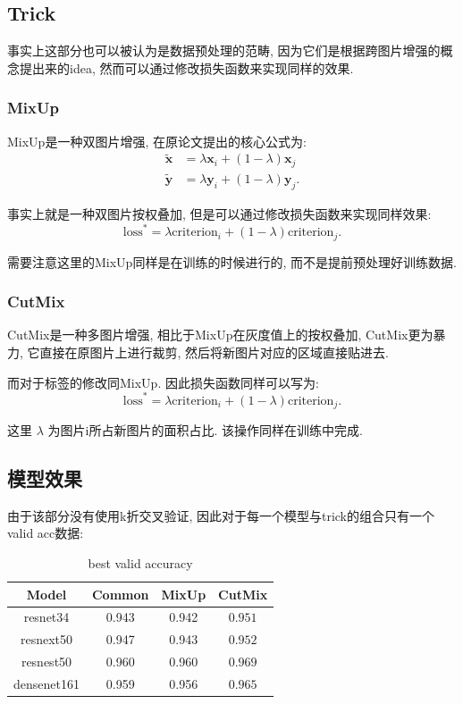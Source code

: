 \documentclass[lang=cn,12pt,a4paper,cite=authoryear]{elegantpaper}
\begin{document}
\subsection{Trick}
事实上这部分也可以被认为是数据预处理的范畴, 因为它们是根据跨图片增强的概念提出来的idea, 然而可以通过修改损失函数来实现同样的效果.
\subsubsection{MixUp}
MixUp是一种双图片增强, 在原论文提出的核心公式为:
\begin{equation*}
\begin{aligned}
    \tilde{\bm{x}} &= \lambda \bm{x}_i + (1 - \lambda)\bm{x}_j\\
    \tilde{\bm{y}} &= \lambda \bm{y}_i + (1 - \lambda)\bm{y}_j.
\end{aligned}
\end{equation*}

事实上就是一种双图片按权叠加, 但是可以通过修改损失函数来实现同样效果:
\begin{equation*}
    \mathrm{loss}^{*} = \lambda \mathrm{criterion}_i + (1 - \lambda) \mathrm{criterion}_j.
\end{equation*}

需要注意这里的MixUp同样是在训练的时候进行的, 而不是提前预处理好训练数据.

\subsubsection{CutMix}
CutMix是一种多图片增强, 相比于MixUp在灰度值上的按权叠加, CutMix更为暴力, 它直接在原图片上进行裁剪, 然后将新图片对应的区域直接贴进去.

而对于标签的修改同MixUp. 因此损失函数同样可以写为:
\begin{equation*}
    \mathrm{loss}^{*} = \lambda \mathrm{criterion}_i + (1 - \lambda) \mathrm{criterion}_j.
\end{equation*}

这里 $\lambda$ 为图片i所占新图片的面积占比. 该操作同样在训练中完成.
\subsection{模型效果}
由于该部分没有使用k折交叉验证, 因此对于每一个模型与trick的组合只有一个valid acc数据:
\begin{table}[htbp]
    \centering
    \begin{tabular}{cccc}
    \hline
    Model & Common & MixUp & CutMix\\
    \hline
    resnet34 & 0.943 & 0.942 & $\mathbf{0.951}$\\
    resnext50 & 0.947 & 0.943 & $\mathbf{0.952}$\\
    resnest50 & 0.960 & 0.960 & $\mathbf{0.969}$\\
    densenet161 & 0.959 & 0.956 & $\mathbf{0.965}$\\
    \hline
    \end{tabular}
    \caption{best valid accuracy}
\end{table}
\end{document}
